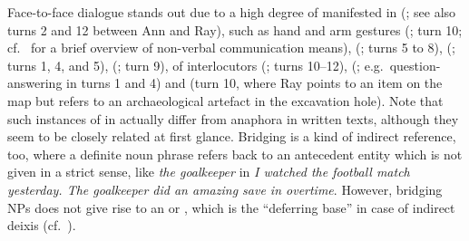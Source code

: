 \documentclass[output=paper,biblatex,babelshorthands,newtxmath,draftmode,colorlinks,citecolor=brown]{langscibook}
\begin{document}
Face-to-face dialogue stands out due to a high degree of  manifested in  (\citealt{Tomasello:1998}; see also turns 2 and 12 between Ann and Ray),  such as hand and arm gestures (\citealt{Kendon:2004,McNeill:2000:a}; turn 10; cf.\  for a brief overview of non-verbal communication means),  (\citealp{Ginzburg:Fernandez:Schlangen:2014}; turns 5 to 8),  (\citealp{Fernandez:Ginzburg:2002,Fernandez:Ginzburg:Lappin:2007}; turns 1, 4, and 5),  (\citealp{Ginzburg:Breitholz:Cooper:Hough:Tian:2015}; turn 9),  of interlocutors (\citealp{Clark:Schreuder:Buttrick:1983}; turns 10--12),  (\citealp{Sacks:Schegloff:Jefferson:1974,heldner2010,levinson2015}; e.g.\ question-answering in turns 1 and 4) and  (turn 10, where Ray points to an item on the map but refers to an archaeological artefact in the excavation hole). Note that such instances of  \citep{Nunberg:1993} in  actually differ from  anaphora \citep{Clark:1975}  in written texts, although they seem to be closely related at first glance. Bridging is a kind of indirect reference, too, where a definite noun phrase refers back to an antecedent entity which is not given in a strict sense, like \textit{the goalkeeper} in \textit{I watched the football match yesterday. The goalkeeper did an amazing save in overtime}. However, bridging NPs does not give rise to an  or , which is the \enquote{deferring base} in case of indirect deixis (cf.\ \citealp{Luecking:2018:a}).
\end{document}
